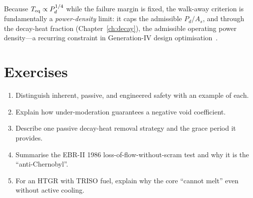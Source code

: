 Because $T_{\rm eq}\propto P_d^{1/4}$ while the failure margin is fixed, the
walk-away criterion is fundamentally a \emph{power-density} limit: it caps the
admissible $P_d/A_s$, and through the decay-heat fraction (Chapter~\ref{ch:decay}),
the admissible operating power density---a recurring constraint in Generation-IV
design optimisation~\cite{waltar}.


\section*{Exercises}
\begin{enumerate}[leftmargin=*,itemsep=2pt]
\item Distinguish inherent, passive, and engineered safety with an example of each.
\item Explain how under-moderation guarantees a negative void coefficient.
\item Describe one passive decay-heat removal strategy and the grace period it provides.
\item Summarise the EBR-II 1986 loss-of-flow-without-scram test and why it is the ``anti-Chernobyl''.
\item For an HTGR with TRISO fuel, explain why the core ``cannot melt'' even without active cooling.
\end{enumerate}
